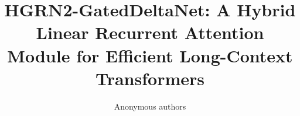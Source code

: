 \title{\textbf{HGRN2-GatedDeltaNet: A Hybrid Linear Recurrent Attention Module for Efficient Long-Context Transformers}}

\author{Anonymous authors}
